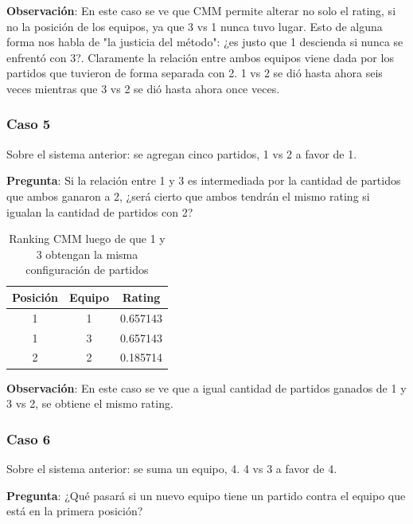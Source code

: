 \textbf{Observación}: En este caso se ve que CMM permite alterar no solo el rating, si no la posición de los equipos, ya que 3 vs 1 nunca tuvo lugar. Esto de alguna forma nos habla de "la justicia del método": ¿es justo que 1 descienda si nunca se enfrentó con 3?. Claramente la relación entre ambos equipos viene dada por los partidos que tuvieron de forma separada con 2. 1 vs 2 se dió hasta ahora seis veces mientras que 3 vs 2 se dió hasta ahora once veces.

\subsubsection*{Caso 5}

Sobre el sistema anterior: se agregan cinco partidos, 1 vs 2 a favor de 1.

\textbf{Pregunta}: Si la relación entre 1 y 3 es intermediada por la cantidad de partidos que ambos ganaron a 2, ¿será cierto que ambos tendrán el mismo rating si igualan la cantidad de partidos con 2?

\begin{table}[h!]
    \begin{center}
        \begin{tabular}{|c|c|c|}
        \hline
        \textbf{Posición} & \textbf{Equipo} & \textbf{Rating} \\
        \hline
        1 & 1 & 0.657143\\
        1 & 3 & 0.657143\\
        2 & 2 & 0.185714\\
        \hline
        \end{tabular}
        \caption{Ranking CMM luego de que 1 y 3 obtengan la misma configuración de partidos}
        \label{cmm_caso_5}
    \end{center}
\end{table}

\textbf{Observación}: En este caso se ve que a igual cantidad de partidos ganados de 1 y 3 vs 2, se obtiene el mismo rating.

\subsubsection*{Caso 6}

Sobre el sistema anterior: se suma un equipo, 4. 4 vs 3 a favor de 4.

\textbf{Pregunta}: ¿Qué pasará si un nuevo equipo tiene un partido contra el equipo que está en la primera posición?

